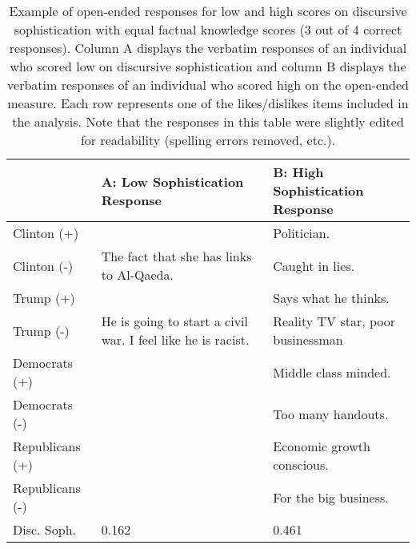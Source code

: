 \begin{table}[ht]\footnotesize\centering
\begin{tabular}{l|p{6.3cm}|p{6.3cm}}
\toprule
	& A: Low Sophistication Response & B: High Sophistication Response \\ \midrule
Clinton (+)		& 																& Politician. \\\hdashline
Clinton (-)		& The fact that she has links to Al-Qaeda. 						& Caught in lies. \\\hdashline
Trump (+)		& 																& Says what he thinks. \\\hdashline
Trump (-)		& He is going to start a civil war. I feel like he is racist. 	& Reality TV star, poor businessman \\\hdashline
Democrats (+)	& 																& Middle class minded. \\\hdashline
Democrats (-)	& 																& Too many handouts. \\\hdashline
Republicans (+)	& 																& Economic growth conscious. \\\hdashline
Republicans (-)	& 																& For the big business. \\\midrule
Disc. Soph. 	& 0.162 														& 0.461 \\\bottomrule
 \end{tabular}
\caption[Example of open-ended responses for low and high scores on discursive sophistication]{Example of open-ended responses for low and high scores on discursive sophistication with equal factual knowledge scores (3 out of 4 correct responses). Column A displays the verbatim responses of an individual who scored low on discursive sophistication and column B displays the verbatim responses of an individual who scored high on the open-ended measure. Each row represents one of the likes/dislikes items included in the analysis. Note that the responses in this table were slightly edited for readability (spelling errors removed, etc.).}\label{tab:ex1}
\end{table}

